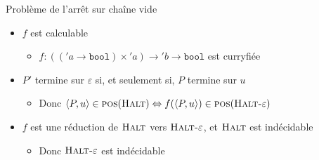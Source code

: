 \begin{frame}{Problème de l'arrêt sur chaîne vide}
{    \vspace{1mm}
    \begin{itemize}
    \item $f$ est calculable
      \begin{itemize}
      \item {} $f : (('a \rightarrow \texttt{bool}) \times {'a}) \rightarrow {'b} \rightarrow \texttt{bool}$ est curryfiée
      \end{itemize}
    \item $P'$ termine sur $\varepsilon$ si, et seulement si, $P$ termine sur $u$
      \begin{itemize}
      \item Donc $\langle P,u \rangle \in \textsc{pos}(\textsc{Halt}) \Leftrightarrow f(\langle P,u \rangle) \in \textsc{pos}(\textsc{Halt-}\varepsilon)$
      \end{itemize}
    \item $f$ est une réduction de $\textsc{Halt}$ vers $\textsc{Halt-}\varepsilon$, et $\textsc{Halt}$ est indécidable
      \begin{itemize}
      \item Donc $\textsc{Halt-}\varepsilon$ est indécidable
      \end{itemize}
    \end{itemize}
  }
\end{frame}

\endgroup

